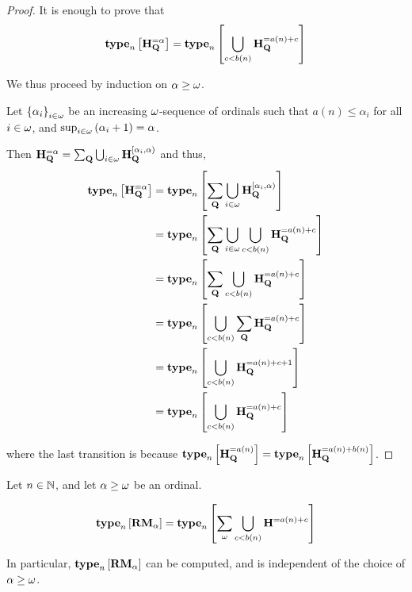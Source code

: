 \begin{proof}
    It is enough to prove that
    \[
        \mathbf{type}_{n} \left[ {\mathbf{H}_{\mathbf{Q}}^{= \alpha}} \right] = \mathbf{type}_{n} \left[ {\bigcup_{c < b(n)}{\mathbf{H}_{\mathbf{Q}}^{= a(n) + c}}} \right]
    \]

    We thus proceed by induction on $\alpha \ge \omega$.

    Let $\left\{ {\alpha_i} \right\}_{i \in \omega}$ be an increasing $\omega$-sequence of ordinals
    such that $a(n) \le \alpha_i$ for all $i \in \omega$,
    and $\sup_{i \in \omega} \left( {\alpha_i + 1} \right) = \alpha$.

    Then $\mathbf{H}_{\mathbf{Q}}^{= \alpha} = \sum_{\mathbf{Q}}{\bigcup_{i \in \omega} \mathbf{H}_{\mathbf{Q}}^{[\alpha_i, \alpha)}}$ and thus,
    \begin{align*}
        \mathbf{type}_{n} \left[ {\mathbf{H}_{\mathbf{Q}}^{= \alpha}} \right]
         & = \mathbf{type}_{n} \left[ {\sum_{\mathbf{Q}} \bigcup_{i \in \omega} \mathbf{H}_{\mathbf{Q}}^{[\alpha_i, \alpha)}} \right]             \\
         & = \mathbf{type}_{n} \left[ {\sum_{\mathbf{Q}} \bigcup_{i \in \omega} \bigcup_{c < b(n)}{\mathbf{H}_{\mathbf{Q}}^{= a(n) + c}}} \right] \\
         & = \mathbf{type}_{n} \left[ {\sum_{\mathbf{Q}} \bigcup_{c < b(n)}{\mathbf{H}_{\mathbf{Q}}^{= a(n) + c}}} \right]                     \\
         & = \mathbf{type}_{n} \left[ {\bigcup_{c < b(n)}{\sum_{\mathbf{Q}} \mathbf{H}_{\mathbf{Q}}^{= a(n) + c}}} \right]                     \\
         & = \mathbf{type}_{n} \left[ {\bigcup_{c < b(n)}{\mathbf{H}_{\mathbf{Q}}^{= a(n) + c + 1}}} \right]                            \\
         & = \mathbf{type}_{n} \left[ {\bigcup_{c < b(n)}{\mathbf{H}_{\mathbf{Q}}^{= a(n) + c}}} \right]
    \end{align*}

    where the last transition is because $\mathbf{type}_{n} \left[ {\mathbf{H}_{\mathbf{Q}}^{= a(n)}} \right] = \mathbf{type}_{n} \left[ {\mathbf{H}_{\mathbf{Q}}^{= a(n) + b(n)}} \right]$.
\end{proof}

\begin{corollary}
    Let $n \in \mathbb{N}$, and let $\alpha \ge \omega$ be an ordinal.

    \[
        \mathbf{type}_{n} \left[ {\mathbf{RM}_{\alpha}} \right]
        = \mathbf{type}_{n} \left[ {\sum_{\omega} {\bigcup_{c < b(n)}{\mathbf{H}_{}^{= a(n) + c}}}} \right]
    \]

    In particular, $\mathbf{type}_{n} \left[ {\mathbf{RM}_{\alpha}} \right]$ can be
    computed, and is independent of the choice of $\alpha \ge \omega$.
\end{corollary}

